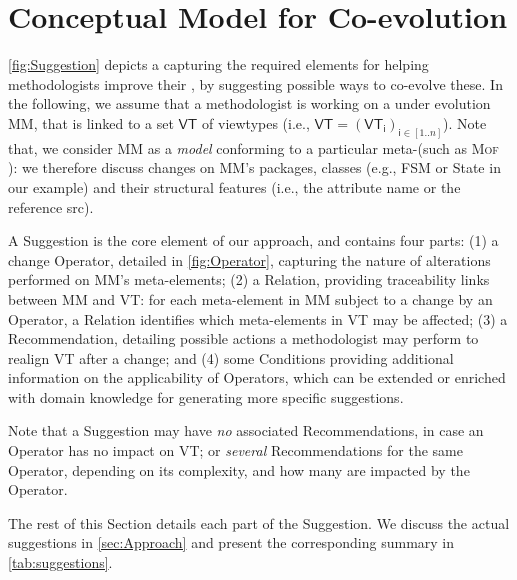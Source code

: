 \section{Conceptual Model for \Viewtype Co-evolution}
\label{sec:Suggestion}

\cref{fig:Suggestion} depicts a \metamodel capturing the
required elements for helping methodologists improve their \viewtypes,
by suggesting possible ways to co-evolve these.
In the following, we assume that a methodologist is working on a \metamodel
under evolution \textsf{MM}, that is linked to a set $\mathsf{VT}$ of viewtypes
(i.e., $\mathsf{VT} = (\mathsf{VT}_\mathsf{i})_{\mathsf{i}\in [1..n]}$). Note that,
we consider \textsf{MM} as a \emph{model}
conforming to a particular meta-\metamodel (such as \textsc{Mof} \cite{TR:OMG-MOF:2016}):
we therefore discuss changes on \textsf{MM}'s packages, classes (e.g., 
\textsf{FSM} or \textsf{State} in our example) and their structural features
(i.e., the attribute \textsf{name} or the reference \textsf{src}).

A \textsf{Suggestion} is the core element of our approach, and contains four 
parts: (1) a change \textsf{Operator}, detailed in \cref{fig:Operator}, 
capturing the nature of alterations performed on \textsf{MM}'s meta-elements; 
(2) a \textsf{Relation}, providing traceability links between \textsf{MM} 
and \textsf{VT}: for each meta-element in \textsf{MM} subject to a 
change by an \textsf{Operator}, a \textsf{Relation} identifies which 
meta-elements in \textsf{VT} may be affected;
(3) a \textsf{Recommendation}, detailing possible actions a methodologist 
may perform to realign \textsf{VT} after a change; and 
(4) some \textsf{Condition}s providing additional information on the applicability
of \textsf{Operator}s, which can be extended or enriched with domain knowledge 
for generating more specific suggestions.


Note that a \textsf{Suggestion} may 
have \emph{no} associated \textsf{Recommendation}s, in case an \textsf{Operator} has no
impact on \textsf{VT}; or \emph{several} \textsf{Recommendation}s for the same 
\textsf{Operator}, depending on its complexity, and how many \viewtypes are 
impacted by the \textsf{Operator}. 

The rest of this Section details each part of the \textsf{Suggestion}. We discuss the actual suggestions in \cref{sec:Approach} and present the corresponding summary in \cref{tab:suggestions}.



